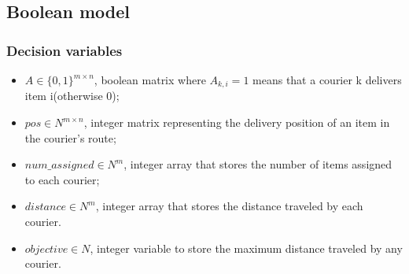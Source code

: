 \documentclass{article}
\begin{document}
\subsection{Boolean model}
\subsubsection{Decision variables}
\begin{itemize}
    \item 
    $A \in \{0,1\}^{m \times n}$, boolean matrix where $A_{k,i} = 1$ means that a courier k delivers item i(otherwise 0);
    \item
    $pos\in {N^{m \times n}}$, integer matrix representing the delivery position of an item in the courier's route;
    \item 
    $num\_assigned \in {N^{m}}$, integer array that stores the number of items assigned to each courier;  
    \item
    $distance \in {N^{m}}$, integer array that stores the distance traveled by each courier.
    \item 
    $objective \in {N}$, integer variable to store the maximum distance traveled by any courier.
\end{itemize}
\end{document}
